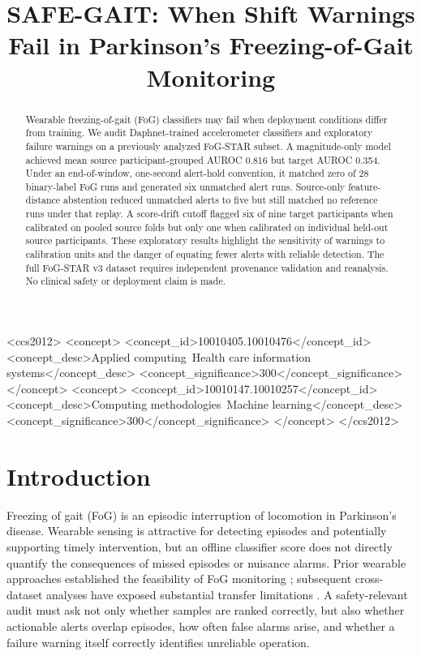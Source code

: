 \documentclass[sigconf,review,anonymous]{acmart}
\begin{document}
\title{SAFE-GAIT: When Shift Warnings Fail in Parkinson's Freezing-of-Gait Monitoring}
\begin{abstract}
Wearable freezing-of-gait (FoG) classifiers may fail when deployment conditions differ from training. We audit Daphnet-trained accelerometer classifiers and exploratory failure warnings on a previously analyzed FoG-STAR subset. A magnitude-only model achieved mean source participant-grouped AUROC 0.816 but target AUROC 0.354. Under an end-of-window, one-second alert-hold convention, it matched zero of 28 binary-label FoG runs and generated six unmatched alert runs. Source-only feature-distance abstention reduced unmatched alerts to five but still matched no reference runs under that replay. A score-drift cutoff flagged six of nine target participants when calibrated on pooled source folds but only one when calibrated on individual held-out source participants. These exploratory results highlight the sensitivity of warnings to calibration units and the danger of equating fewer alerts with reliable detection. The full FoG-STAR v3 dataset requires independent provenance validation and reanalysis. No clinical safety or deployment claim is made.
\end{abstract}
\begin{CCSXML}
<ccs2012>
 <concept>
  <concept_id>10010405.10010476</concept_id>
  <concept_desc>Applied computing~Health care information systems</concept_desc>
  <concept_significance>300</concept_significance>
 </concept>
 <concept>
  <concept_id>10010147.10010257</concept_id>
  <concept_desc>Computing methodologies~Machine learning</concept_desc>
  <concept_significance>300</concept_significance>
 </concept>
</ccs2012>
\end{CCSXML}
\maketitle
\section{Introduction}
Freezing of gait (FoG) is an episodic interruption of locomotion in Parkinson's disease. Wearable sensing is attractive for detecting episodes and potentially supporting timely intervention, but an offline classifier score does not directly quantify the consequences of missed episodes or nuisance alarms. Prior wearable approaches established the feasibility of FoG monitoring \cite{bachlin2010}; subsequent cross-dataset analyses have exposed substantial transfer limitations \cite{sigcha2024cross,lin2026}. A safety-relevant audit must ask not only whether samples are ranked correctly, but also whether actionable alerts overlap episodes, how often false alarms arise, and whether a failure warning itself correctly identifies unreliable operation.
\end{document}
